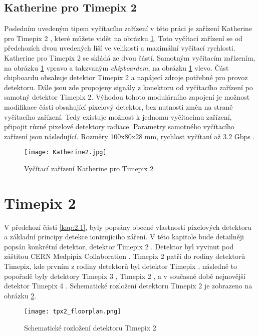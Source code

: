 \subsection{Katherine pro Timepix 2} %
\label{Katherine}
Posledním uvedeným tipem vyčítacího zařízení v této práci je zařízení Katherine pro Timepix 2 \cite{Burian_2020}, které můžete vidět na obrázku \ref{fig:Katherine2}. Toto vyčítací zařízení se od předchozích dvou uvedených liší ve velikosti a maximální vyčítací rychlosti. Katherine pro Timepix 2 se skládá ze dvou částí. Samotným vyčítacím zařízením, na obrázku \ref{fig:Katherine2} vpravo a takzvaným \textit{chipboardem}, na obrázku \ref{fig:Katherine2} vlevo. Část chipboardu obsahuje detektor Timepix 2 a napájecí zdroje potřebné pro provoz detektoru. Dále jsou zde propojeny signály z konektoru od vyčítacího zařízení po samotný detektor Timepix 2. Výhodou tohoto modulárního zapojení je možnost modifikace části obsahující pixelový detektor, bez nutnosti změn na straně vyčítacího zařízení. Tedy existuje možnost k jednomu vyčítacímu zařízení, připojit různé pixelové detektory radiace. Parametry samotného vyčítacího zařízení jsou následující. Rozměry 100x80x28 mm, rychlost vyčítaní až 3.2 Gbps \cite{Burian_2020}.
\begin{figure}[h!]
	\centering
	\captionsetup{justification=centering}
	\texttt{[image: Katherine2.jpg]}
	\caption{Vyčítací zařízení Katherine pro Timepix 2 \cite{Burian_2020}} 
	\label{fig:Katherine2}
\end{figure}	


\section{Timepix 2}
\label{Timepix2}
V předchozí části \ref{kap:2.1}, byly popsány obecné vlastnosti pixelových detektoru a základní principy detekce ionizujícího záření. V této kapitole bude detailněji popsán konkrétní detektor, detektor Timepix 2 \cite{tpx2_manual}. Detektor byl vyvinut pod záštitou CERN Medpipix Collaboration \cite{Medpix}. Timepix 2 patří do rodiny detektorů Timepix, kde prvním z rodiny detektorů byl detektor Timepix \cite{Llopart}, následně to popořadě byly detektory Timepix 3 \cite{Timepix3}, Timepix 2 \cite{tpx2_manual}, \cite{Timepix2} a v současné době nejnovější detektor Timepix 4 \cite{Timepix4}. Schematické rozložení detektoru Timepix 2 je zobrazeno na obrázku \ref{fig:tpx2_floorplan}. 
\begin{figure}[h!]
	\centering
	\captionsetup{justification=centering}
	\texttt{[image: tpx2\_floorplan.png]}
	\caption{Schematické rozložení detektoru Timepix 2 \cite{tpx2_manual}} 
	\label{fig:tpx2_floorplan}
\end{figure}	

